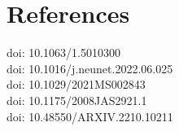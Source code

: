 \section{References}
\vspace{1em}
\begin{minipage}{\textwidth}
         doi: 10.1063/1.5010300 \\
         doi: 10.1016/j.neunet.2022.06.025 \\
         doi: 10.1029/2021MS002843 \\
         doi: 10.1175/2008JAS2921.1 \\
         doi: 10.48550/ARXIV.2210.10211
\end{minipage}
